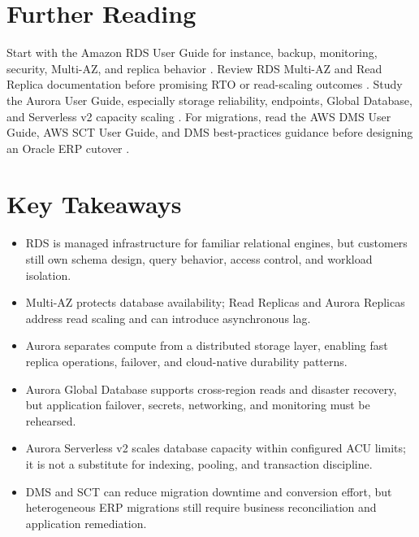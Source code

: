 \section{Further Reading}
Start with the Amazon RDS User Guide for instance, backup, monitoring, security, Multi-AZ, and replica behavior \cite{awsRDSUserGuide}. Review RDS Multi-AZ and Read Replica documentation before promising RTO or read-scaling outcomes \cite{awsRDSMultiAZ,awsRDSReadReplicas}. Study the Aurora User Guide, especially storage reliability, endpoints, Global Database, and Serverless v2 capacity scaling \cite{awsAuroraUserGuide,awsAuroraStorage,awsAuroraGlobalDatabase,awsAuroraServerlessV2}. For migrations, read the AWS DMS User Guide, AWS SCT User Guide, and DMS best-practices guidance before designing an Oracle ERP cutover \cite{awsDMSUserGuide,awsSCTUserGuide,awsDMSBestPractices}.

\section*{Key Takeaways}
\begin{itemize}
    \item RDS is managed infrastructure for familiar relational engines, but customers still own schema design, query behavior, access control, and workload isolation.
    \item Multi-AZ protects database availability; Read Replicas and Aurora Replicas address read scaling and can introduce asynchronous lag.
    \item Aurora separates compute from a distributed storage layer, enabling fast replica operations, failover, and cloud-native durability patterns.
    \item Aurora Global Database supports cross-region reads and disaster recovery, but application failover, secrets, networking, and monitoring must be rehearsed.
    \item Aurora Serverless v2 scales database capacity within configured ACU limits; it is not a substitute for indexing, pooling, and transaction discipline.
    \item DMS and SCT can reduce migration downtime and conversion effort, but heterogeneous ERP migrations still require business reconciliation and application remediation.
\end{itemize}

